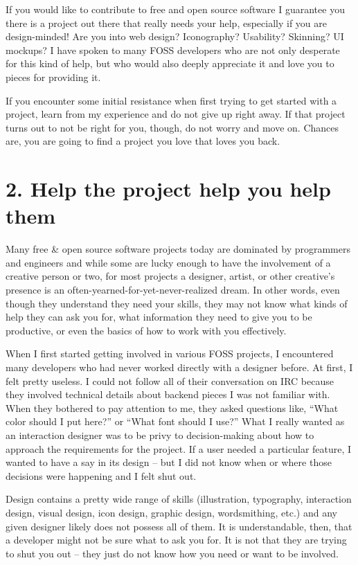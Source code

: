 If you would like to contribute to free and open source software I guarantee you
there is a project out there that really needs your help, especially if you are
design-minded! Are you into web design? Iconography? Usability? Skinning? UI
mockups? I have spoken to many FOSS developers who are not only desperate for
this kind of help, but who would also deeply appreciate it and love you to
pieces for providing it.

If you encounter some initial resistance when first trying to get started with a
project, learn from my experience and do not give up right away. If that project
turns out to not be right for you, though, do not worry and move on. Chances are,
you are going to find a project you love that loves you back.

\section*{2. Help the project help you help them}

Many free \& open source software projects today are dominated by programmers and
engineers and while some are lucky enough to have the involvement of a creative
person or two, for most projects a designer, artist, or other creative's
presence is an often-yearned-for-yet-never-realized dream. In other words, even
though they understand they need your skills, they may not know what kinds of
help they can ask you for, what information they need to give you to be
productive, or even the basics of how to work with you effectively. 

When I first started getting involved in various FOSS projects, I encountered
many developers who had never worked directly with a designer before. At first,
I felt pretty useless. I could not follow all of their conversation on IRC
because they involved technical details about backend pieces I was not familiar
with. When they bothered to pay attention to me, they asked questions like,
``What color should I put here?'' or ``What font should I use?'' What I really
wanted as an interaction designer was to be privy to decision-making about how
to approach the requirements for the project. If a user needed a particular
feature, I wanted to have a say in its design -- but I did not know when or where
those decisions were happening and I felt shut out.

Design contains a pretty wide range of skills (illustration, typography,
interaction design, visual design, icon design, graphic design, wordsmithing,
etc.) and any given designer likely does not possess all of them. It is
understandable, then, that a developer might not be sure what to ask you for.
It is not that they are trying to shut you out -- they just do not know how you
need or want to be involved.

